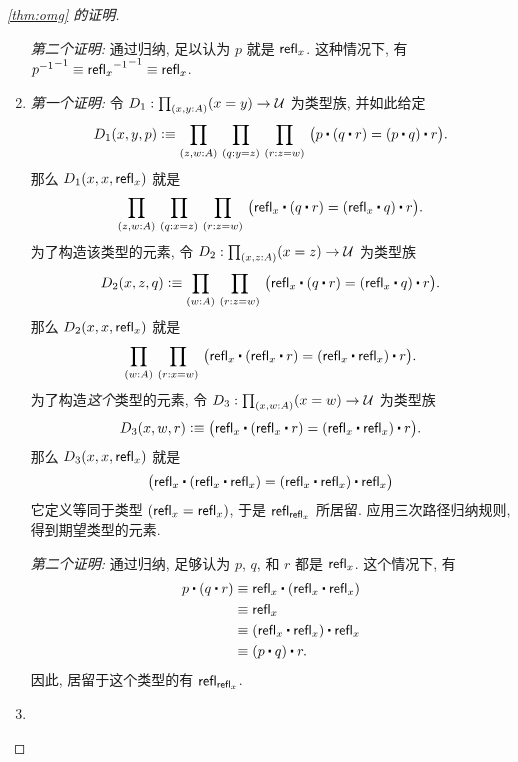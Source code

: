 \begin{proof}[\cref{thm:omg} 的证明]
\begin{enumerate}
        \mentalpause

        \noindent \emph{第二个证明:} 通过归纳, 足以认为 $p$ 就是 $\mathsf{refl}_{x}$.
        这种情况下, 有 $\mathord{{\mathord{{p}^{-1}}}^{-1}}\equiv \mathord{{\mathord{{\mathsf{refl}_{x}}^{-1}}}^{-1}} \equiv \mathsf{refl}_{x}$.

        \item \emph{第一个证明:} 令 $D_1:\prd{x,y:A} (x=y) \to \type$ 为类型族, 并如此给定
        \begin{equation*}
            D_1(x,y,p)\defeq\prd{z,w:A}{q:y= z}{r:z= w} \big(p\ct (q\ct r)= (p\ct q)\ct r\big).
        \end{equation*}
        那么 $D_1(x,x,\mathsf{refl}_{x})$ 就是
        \begin{equation*}
            \prd{z,w:A}{q:x= z}{r:z= w} \big(\refl{x}\ct(q\ct r)= (\refl{x}\ct q)\ct r\big).
        \end{equation*}
        为了构造该类型的元素, 令 $D_2:\prd{x,z:A} (x=z) \to \type$ 为类型族
        \begin{equation*}
            D_2 (x,z,q) \defeq \prd{w:A}{r:z=w} \big(\refl{x}\ct(q\ct r)= (\refl{x}\ct q)\ct r\big).
        \end{equation*}
        那么 $D_2(x,x,\mathsf{refl}_{x})$ 就是
        \begin{equation*}
            \prd{w:A}{r:x=w} \big(\refl{x}\ct(\refl{x}\ct r)= (\refl{x}\ct \refl{x})\ct r\big).
        \end{equation*}
        为了构造\emph{这个}类型的元素, 令 $D_3:\prd{x,w:A} (x=w) \to \type$ 为类型族
        \begin{equation*}
            D_3(x,w,r) \defeq \big(\refl{x}\ct(\refl{x}\ct r)= (\refl{x}\ct \refl{x})\ct r\big).
        \end{equation*}
        那么 $D_3(x,x,\mathsf{refl}_{x})$ 就是
        \begin{equation*}
            \big(\refl{x}\ct(\refl{x}\ct \refl{x})= (\refl{x}\ct \refl{x})\ct \refl{x}\big)
        \end{equation*}
        它定义等同于类型 $(\mathsf{refl}_{x} = \mathsf{refl}_{x})$, 于是 $\mathsf{refl}_{\mathsf{refl}_{x}}$ 所居留.
        应用三次路径归纳规则, 得到期望类型的元素.

        \mentalpause

        \noindent \emph{第二个证明:} 通过归纳, 足够认为 $p$, $q$, 和 $r$ 都是 $\mathsf{refl}_{x}$.
        这个情况下, 有
        \begin{align*}
            p\ct (q\ct r)
            &\jdeq \refl{x}\ct(\refl{x}\ct \refl{x})\\
            &\jdeq \refl{x}\\
            &\jdeq (\refl{x}\ct \refl x)\ct \refl x\\
            &\jdeq (p\ct q)\ct r.
        \end{align*}
        因此, 居留于这个类型的有 $\mathsf{refl}_{\mathsf{refl}_{x}}$.
        \item \qedhere
    \end{enumerate}
\end{proof}

